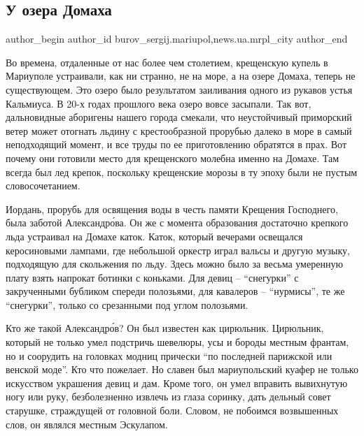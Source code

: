  
 
 
 
 
 
\subsection{У озера Домаха}
\label{sec:11_02_2017.stz.news.ua.mrpl_city.1.u_ozera_domaha}
 
\ifcmt
 author_begin
   author_id burov_sergij.mariupol,news.ua.mrpl_city
 author_end
\fi

Во времена, отдаленные от нас более чем столетием, крещенскую купель в
Мариуполе устраивали, как  ни странно,  не на море, а на озере Домаха, теперь
не существующем. Это озеро было результатом заиливания одного из рукавов устья
Кальмиуса.  В 20-х годах прошлого века озеро вовсе засыпали. Так вот,
дальновидные аборигены нашего  города  смекали, что неустойчивый приморский
ветер может отогнать льдину с  крестообразной прорубью  далеко в море в самый
неподходящий момент, и все труды по ее приготовлению обратятся в прах.  Вот
почему они готовили место  для крещенского молебна именно на Домахе. Там всегда
был лед крепок, поскольку  крещенские морозы в ту эпоху были не пустым
словосочетанием.


Иордань, прорубь для освящения воды в честь памяти Крещения Господнего,  была
заботой Александр\'ова. Он же с момента образования достаточно крепкого льда
устраивал на Домахе каток. Каток, который вечерами освещался керосиновыми
лампами, где небольшой оркестр играл вальсы  и другую музыку, подходящую  для
скольжения по льду. Здесь можно было за  весьма умеренную плату взять напрокат
ботинки с коньками. Для девиц – \enquote{снегурки} с закрученными бубликом спереди
полозьями, для кавалеров – \enquote{нурмисы}, те же \enquote{снегурки}, только со срезанными
под углом полозьями.

Кто же такой Александр\'ов? Он был известен как цирюльник. Цирюльник, который не
только умел  подстричь шевелюры, усы и бороды  местным франтам, но и соорудить
на головках модниц прически \enquote{по последней парижской или венской моде}. Кто что
пожелает. Но славен был мариупольский куафер не только  искусством  украшения
девиц и дам. Кроме того, он умел вправить вывихнутую ногу или руку,
безболезненно извлечь из глаза  соринку, дать дельный совет старушке,
страждущей от головной боли. Словом, не побоимся возвышенных  слов, он являлся
местным Эскулапом.

